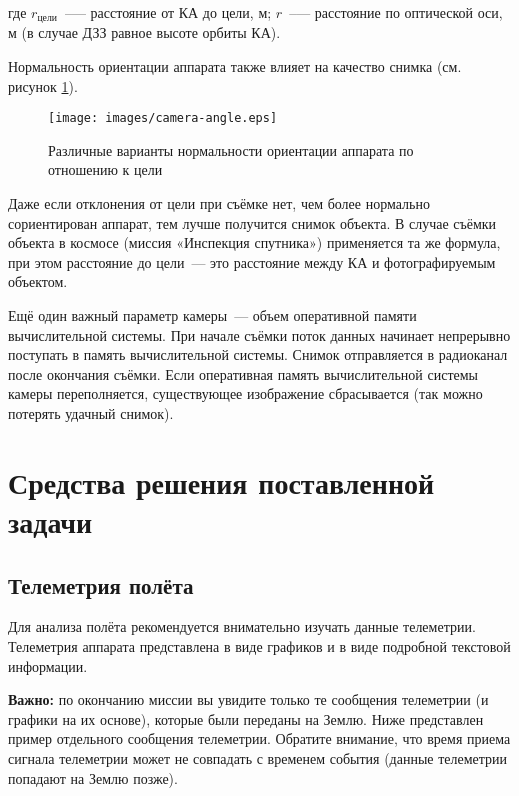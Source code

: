 \documentclass[12pt,a4paper]{article}
\begin{document}
где $r_{\text{цели}}$~--— расстояние от КА до цели, м; $r$~--— расстояние по оптической
оси, м (в случае ДЗЗ равное высоте орбиты КА).

Нормальность ориентации аппарата также влияет на качество снимка (см. рисунок
\ref{Pic:Camera-Angle}).

\begin{figure}[tbh]
  \begin{center}
    \texttt{[image: images/camera-angle.eps]}
    \caption{Различные варианты нормальности ориентации аппарата по отношению к цели}
    \label{Pic:Camera-Angle}
  \end{center}
\end{figure}

Даже если отклонения от цели при съёмке нет, чем более нормально сориентирован аппарат, тем лучше получится снимок объекта.
В случае съёмки объекта в космосе (миссия «Инспекция спутника») применяется та же формула,
при этом расстояние до цели~--- это расстояние между КА и фотографируемым объектом.

Ещё один важный параметр камеры~--- объем оперативной памяти вычислительной системы. При
начале съёмки поток данных начинает непрерывно поступать в память вычислительной
системы. Снимок отправляется в радиоканал после окончания съёмки. Если оперативная память
вычислительной системы камеры переполняется, существующее изображение сбрасывается (так
можно потерять удачный снимок).

\section{Средства решения поставленной задачи}

\subsection{Телеметрия полёта}

Для анализа полёта рекомендуется внимательно изучать данные телеметрии. Телеметрия
аппарата представлена в виде графиков и в виде подробной текстовой информации.

\textbf{Важно:} по окончанию миссии вы увидите только те сообщения телеметрии (и графики
на их основе), которые были переданы на Землю. Ниже представлен пример отдельного
сообщения телеметрии. Обратите внимание, что время приема сигнала телеметрии может не
совпадать с временем события (данные телеметрии попадают на Землю позже).
\end{document}
